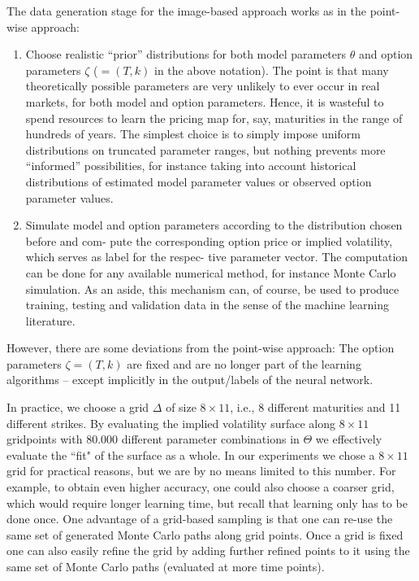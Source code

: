 \documentclass{article}
\theoremstyle{remark}
\begin{document}
The data generation stage for the image-based approach works as in the point-wise approach:
\begin{enumerate}
\item Choose realistic “prior” distributions for both model parameters $\theta$ and option parameters $\zeta$
 ($= (T, k)$ in the above notation). The point is that many theoretically possible parameters
are very unlikely to ever occur in real markets, for both model and option parameters. Hence,
it is wasteful to spend resources to learn the pricing map for, say, maturities in the range of
hundreds of years. The simplest choice is to simply impose uniform distributions on truncated
parameter ranges, but nothing prevents more “informed” possibilities, for instance taking
into account historical distributions of estimated model parameter values or observed option
parameter values.
\item Simulate model and option parameters according to the distribution chosen before and com-
pute the corresponding option price or implied volatility, which serves as label for the respec-
tive parameter vector. The computation can be done for any available numerical method,
for instance Monte Carlo simulation. As an aside, this mechanism can, of course, be used to
produce training, testing and validation data in the sense of the machine learning literature.
\end{enumerate}

However, there are some deviations from the point-wise approach:
The option parameters $\zeta = (T,k)$ are fixed and are no longer part of the learning algorithms 
-- except implicitly in the output/labels of the neural network.


In practice, we choose a grid $\Delta$ of size $8\times 11$, i.e., 8 different maturities and 11 different strikes.
By evaluating the implied volatility surface along $8\times 11$ gridpoints with $80.000$ different parameter combinations in $\Theta$
we effectively evaluate the ``fit" of the surface as a whole.
In our experiments we chose a $8\times 11$ grid for practical reasons, but we are by no means limited to this number.
For example, to obtain even higher accuracy, one could also choose a coarser grid, which would require longer learning time, but recall that learning only has to be done once. One advantage of a grid-based sampling is that one can re-use the same set of generated Monte Carlo paths along grid points. Once a grid is fixed one can also easily refine the grid by adding further refined points to it using the same set of Monte Carlo paths (evaluated at more time points).
\end{document}

